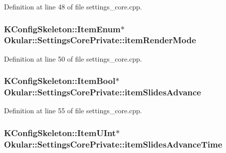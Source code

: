 Definition at line 48 of file settings\+\_\+core.\+cpp.

\hypertarget{classOkular_1_1SettingsCorePrivate_a71e8dac91dc9da059a8a263611d5326b}{
\subsubsection[{item\+Render\+Mode}]{\setlength{\rightskip}{0pt plus 5cm}K\+Config\+Skeleton\+::\+Item\+Enum$\ast$ Okular\+::\+Settings\+Core\+Private\+::item\+Render\+Mode}}\label{classOkular_1_1SettingsCorePrivate_a71e8dac91dc9da059a8a263611d5326b}


Definition at line 50 of file settings\+\_\+core.\+cpp.

\hypertarget{classOkular_1_1SettingsCorePrivate_a0fd9d5aaed5f7710aa864b4a14205fce}{
\subsubsection[{item\+Slides\+Advance}]{\setlength{\rightskip}{0pt plus 5cm}K\+Config\+Skeleton\+::\+Item\+Bool$\ast$ Okular\+::\+Settings\+Core\+Private\+::item\+Slides\+Advance}}\label{classOkular_1_1SettingsCorePrivate_a0fd9d5aaed5f7710aa864b4a14205fce}


Definition at line 55 of file settings\+\_\+core.\+cpp.

\hypertarget{classOkular_1_1SettingsCorePrivate_af1eb3ad8f742a1589e5d07caa145ddbe}{
\subsubsection[{item\+Slides\+Advance\+Time}]{\setlength{\rightskip}{0pt plus 5cm}K\+Config\+Skeleton\+::\+Item\+U\+Int$\ast$ Okular\+::\+Settings\+Core\+Private\+::item\+Slides\+Advance\+Time}}\label{classOkular_1_1SettingsCorePrivate_af1eb3ad8f742a1589e5d07caa145ddbe}


